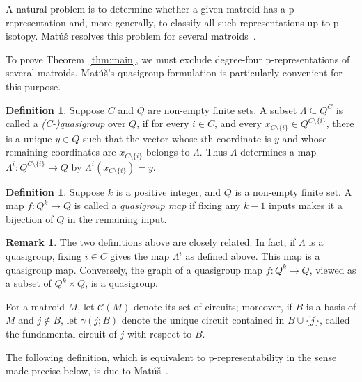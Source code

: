 \documentclass[preprint,12pt]{elsarticle}
\theoremstyle{definition}
\newtheorem{definition}[theorem]{Definition}
\newtheorem{remark}[theorem]{Remark}
\begin{document}
A natural problem is to determine whether a given matroid has a p-representation and, more generally, to classify all such representations up to p-isotopy. Mat\'u\v{s} resolves this problem for several matroids~\cite{Matus1999}.

To prove Theorem~\ref{thm:main}, we must exclude degree-four p-representations of several matroids. Mat\'u\v{s}'s quasigroup formulation is particularly convenient for this purpose.

\begin{definition}
	Suppose $C$ and $Q$ are non-empty finite sets. A subset $\Lambda \subseteq Q^C$
	is called a \emph{(C-)quasigroup} over $Q$, if for every $i \in C$, and every
	 $x_{C\setminus\{i\}}\in Q^{C\setminus\{i\}}$, there is a unique $y\in Q$ such that the vector whose $i$th coordinate is $y$ and whose remaining coordinates are $x_{C\setminus\{i\}}$ belongs to $\Lambda$. Thus $\Lambda$ determines a map $\Lambda^i:Q^{C\setminus\{i\}}\to Q$ by $\Lambda^i(x_{C\setminus\{i\}})=y$.
\end{definition}

\begin{definition}
	Suppose $k$ is a positive integer, and $Q$ is a non-empty finite set. A map
	$f:Q^k \rightarrow Q$ is called a \emph{quasigroup map} if fixing any $k-1$ inputs makes it a bijection of $Q$ in the remaining input.
\end{definition}

\begin{remark}
	The two definitions above are closely related. In fact, if $\Lambda$ is a quasigroup, fixing $i \in C$ gives the map $\Lambda^i$ as defined above. This map is a quasigroup map. Conversely, the graph of a quasigroup map $f:Q^k\to Q$, viewed as a subset of $Q^k\times Q$, is a quasigroup.
\end{remark}

For a matroid $M$, let $\mathcal{C}(M)$ denote its set of circuits; moreover, if $B$ is a basis of $M$ and $j\notin B$, let $\gamma(j;B)$ denote the unique circuit contained in $B\cup\{j\}$, called the fundamental circuit of $j$ with respect to $B$.

The following definition, which is equivalent to p-representability in the sense made precise below, is due to Mat\'u\v{s}~\cite[Definition~2.1]{Matus1999}.
\end{document}
